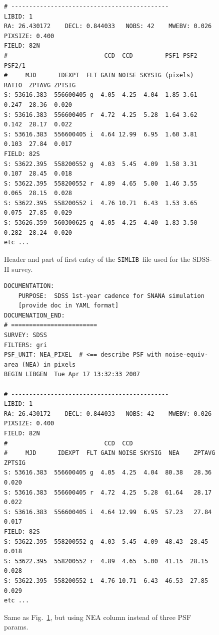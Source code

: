 \documentclass[12pt]{article}
\newcommand{\simlib}{{\tt SIMLIB}}
\begin{document}
{\begin{figure} [ht]
\begin{center}
\begin{Verbatim}[frame=single]
# -------------------------------------------- 
LIBID: 1 
RA: 26.430172    DECL: 0.844033   NOBS: 42    MWEBV: 0.026   PIXSIZE: 0.400 
FIELD: 82N
#                           CCD  CCD         PSF1 PSF2 PSF2/1                    
#     MJD      IDEXPT  FLT GAIN NOISE SKYSIG (pixels)  RATIO  ZPTAVG ZPTSIG
S: 53616.383  556600405 g  4.05  4.25  4.04  1.85 3.61 0.247  28.36  0.020 
S: 53616.383  556600405 r  4.72  4.25  5.28  1.64 3.62 0.142  28.17  0.022 
S: 53616.383  556600405 i  4.64 12.99  6.95  1.60 3.81 0.103  27.84  0.017 
FIELD: 82S
S: 53622.395  558200552 g  4.03  5.45  4.09  1.58 3.31 0.107  28.45  0.018 
S: 53622.395  558200552 r  4.89  4.65  5.00  1.46 3.55 0.065  28.15  0.028 
S: 53622.395  558200552 i  4.76 10.71  6.43  1.53 3.65 0.075  27.85  0.029 
S: 53626.359  560300625 g  4.05  4.25  4.40  1.83 3.50 0.282  28.24  0.020 
etc ...
\end{Verbatim}
\end{center}
\caption{
  Header and part of first entry of the \simlib\ file used for
  the SDSS-II survey.
 }
\label{fig:simlib}
\end{figure}


\begin{figure} [ht] 
\begin{center}
\begin{Verbatim}[frame=single]
DOCUMENTATION:
    PURPOSE:  SDSS 1st-year cadence for SNANA simulation
    [provide doc in YAML format]
DOCUMENATION_END:
# ========================
SURVEY: SDSS     
FILTERS: gri 
PSF_UNIT: NEA_PIXEL  # <== describe PSF with noise-equiv-area (NEA) in pixels
BEGIN LIBGEN  Tue Apr 17 13:32:33 2007
 
# -------------------------------------------- 
LIBID: 1 
RA: 26.430172    DECL: 0.844033   NOBS: 42    MWEBV: 0.026   PIXSIZE: 0.400 
FIELD: 82N
#                           CCD  CCD        
#     MJD      IDEXPT  FLT GAIN NOISE SKYSIG  NEA    ZPTAVG ZPTSIG
S: 53616.383  556600405 g  4.05  4.25  4.04  80.38   28.36  0.020 
S: 53616.383  556600405 r  4.72  4.25  5.28  61.64   28.17  0.022 
S: 53616.383  556600405 i  4.64 12.99  6.95  57.23   27.84  0.017 
FIELD: 82S
S: 53622.395  558200552 g  4.03  5.45  4.09  48.43  28.45  0.018 
S: 53622.395  558200552 r  4.89  4.65  5.00  41.15  28.15  0.028 
S: 53622.395  558200552 i  4.76 10.71  6.43  46.53  27.85  0.029 
etc ...
\end{Verbatim}
\end{center}
\caption{
  Same as Fig.~\ref{fig:simlib}, but using NEA column instead of
  three PSF params.
 }
\label{fig:simlib_nea}
\end{figure}



}
\end{document}
